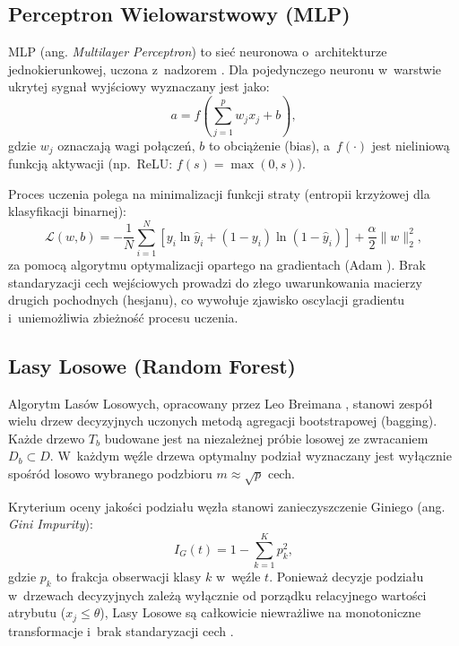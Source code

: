 \subsection{Perceptron Wielowarstwowy (MLP)}
MLP (ang. \textit{Multilayer Perceptron}) to sieć neuronowa o~architekturze jednokierunkowej, uczona z~nadzorem \cite{SklearnDocs}. Dla pojedynczego neuronu w~warstwie ukrytej sygnał wyjściowy wyznaczany jest jako:
\begin{equation}
a = f\left( \sum_{j=1}^{p} w_j x_j + b \right),
\end{equation}
gdzie $w_j$ oznaczają wagi połączeń, $b$ to obciążenie (bias), a~$f(\cdot)$ jest nieliniową funkcją aktywacji (np.~ReLU: $f(s) = \max(0, s)$).

Proces uczenia polega na minimalizacji funkcji straty (entropii krzyżowej dla klasyfikacji binarnej):
\begin{equation}
\mathcal{L}(w, b) = -\frac{1}{N} \sum_{i=1}^{N} \left[ y_i \ln \hat{y}_i + (1 - y_i) \ln (1 - \hat{y}_i) \right] + \frac{\alpha}{2} \|w\|_2^2,
\end{equation}
za pomocą algorytmu optymalizacji opartego na gradientach (Adam \cite{KingmaBa2015}). Brak standaryzacji cech wejściowych prowadzi do złego uwarunkowania macierzy drugich pochodnych (hesjanu), co wywołuje zjawisko oscylacji gradientu i~uniemożliwia zbieżność procesu uczenia.

\subsection{Lasy Losowe (Random Forest)}
Algorytm Lasów Losowych, opracowany przez Leo Breimana \cite{Breiman2001}, stanowi zespół wielu drzew decyzyjnych uczonych metodą agregacji bootstrapowej (bagging). Każde drzewo $T_b$ budowane jest na niezależnej próbie losowej ze zwracaniem $D_b \subset D$. W~każdym węźle drzewa optymalny podział wyznaczany jest wyłącznie spośród losowo wybranego podzbioru $m \approx \sqrt{p}$ cech.

Kryterium oceny jakości podziału węzła stanowi zanieczyszczenie Giniego (ang. \textit{Gini Impurity}):
\begin{equation}
I_G(t) = 1 - \sum_{k=1}^{K} p_k^2,
\end{equation}
gdzie $p_k$ to frakcja obserwacji klasy $k$ w~węźle $t$. Ponieważ decyzje podziału w~drzewach decyzyjnych zależą wyłącznie od porządku relacyjnego wartości atrybutu ($x_j \le \theta$), Lasy Losowe są całkowicie niewrażliwe na monotoniczne transformacje i~brak standaryzacji cech \cite{Breiman2001}.

